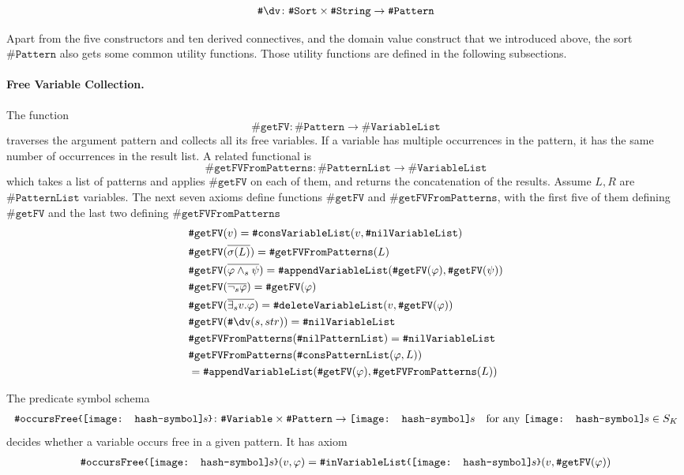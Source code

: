 \documentclass[UTF8,11pt]{article}
\theoremstyle{plain}
\theoremstyle{definition}
\theoremstyle{remark}
\newcommand{\parametric}[2]{{#1}\raisebox{.2ex}{\texttt{\footnotesize{\{}}}#2\raisebox{.2ex}{\texttt{\footnotesize{\}}}}}
\newcommand{\shp}{\texttt{[image: hash-symbol]}\kern-0.1em}
\newcommand{\sharpsymbol}{\#}
\newcommand{\shs}{\shp s}
\newcommand{\KString}{\texttt{\sharpsymbol String}}
\newcommand{\KSort}{\texttt{\sharpsymbol Sort}}
\newcommand{\KPatternList}{\texttt{\sharpsymbol PatternList}}
\newcommand{\KnilKPatternList}{\texttt{\sharpsymbol nilPatternList}}
\newcommand{\KconsKPatternList}{\texttt{\sharpsymbol consPatternList}}
\newcommand{\KVariableList}{\texttt{\sharpsymbol VariableList}\xspace}
\newcommand{\KnilKVariableList}{\texttt{\sharpsymbol nilVariableList}}
\newcommand{\KconsKVariableList}{\texttt{\sharpsymbol consVariableList}}
\newcommand{\KinKVariableList}{\texttt{\sharpsymbol inVariableList}}
\newcommand{\KappendKVariableList}{\texttt{\sharpsymbol appendVariableList}}
\newcommand{\KdeleteKVariableList}{\texttt{\sharpsymbol deleteVariableList}}
\newcommand{\KVariable}{\texttt{\sharpsymbol Variable}}
\newcommand{\KPattern}{\texttt{\sharpsymbol Pattern}}
\newcommand{\Kdv}{\texttt{\sharpsymbol \slashsymbol dv}}
\newcommand{\KgetFV}{\texttt{\sharpsymbol getFV}}
\newcommand{\KgetFVFromPatterns}{\texttt{\sharpsymbol getFVFromPatterns}}
\newcommand{\KoccursFree}{\texttt{\sharpsymbol occursFree}}
\newcommand{\slashsymbol}{\symbol{92}}
\begin{document}
$$
\Kdv \colon \KSort \times \KString \to \KPattern
$$

Apart from the five constructors and ten derived connectives, and the domain 
value construct that we introduced above, 
the sort $\KPattern$ also gets some common utility functions.
Those utility functions are defined in the following subsections.

\paragraph{Free Variable Collection.}
The function
$$\KgetFV \colon \KPattern \to \KVariableList$$
traverses the argument pattern and collects all its free variables.
If a variable has multiple occurrences in the pattern, it has the same 
number of occurrences in the result list.
A related functional is 
$$ \KgetFVFromPatterns \colon \KPatternList \to \KVariableList $$
which takes a list of patterns and applies $\KgetFV$ on each of them, and 
returns the concatenation of the results.
Assume $L,R$ are $\KPatternList$ variables. 
The next seven axioms define functions $\KgetFV$ and $\KgetFVFromPatterns$, 
with the 
first five of them defining $\KgetFV$ and the last two defining 
$\KgetFVFromPatterns$
\begin{align*}
& \KgetFV(v) = \KconsKVariableList(v, \KnilKVariableList)
\\
& \KgetFV(\overline{\sigma(L)}) = \KgetFVFromPatterns(L)
\\
& \KgetFV(\overline{\varphi \wedge_s \psi}) = 
\KappendKVariableList(\KgetFV(\varphi), \KgetFV(\psi))
\\
& \KgetFV(\overline{\neg_s \varphi}) = \KgetFV(\varphi)
\\
& \KgetFV(\overline{\exists_s v . \varphi}) = \KdeleteKVariableList(v, 
\KgetFV(\varphi))
\\
& \KgetFV(\Kdv(s, str)) = \KnilKVariableList
\\
& \KgetFVFromPatterns(\KnilKPatternList) = \KnilKVariableList
\\
& \KgetFVFromPatterns(\KconsKPatternList(\varphi, L))
\\
& = \KappendKVariableList(\KgetFV(\varphi), \KgetFVFromPatterns(L))
\end{align*}

The predicate symbol schema
$$ \parametric{\KoccursFree}{\shs} \colon \KVariable \times \KPattern \to \shs 
\quad 
\text{for any $\shs \in S_K$} $$
decides whether a variable occurs free in a given pattern. It has axiom
\begin{align*}
  \parametric{\KoccursFree}{\shs}(v, \varphi) = 
  \parametric{\KinKVariableList}{\shs}(v, 
  \KgetFV(\varphi))
\end{align*}
\end{document}
